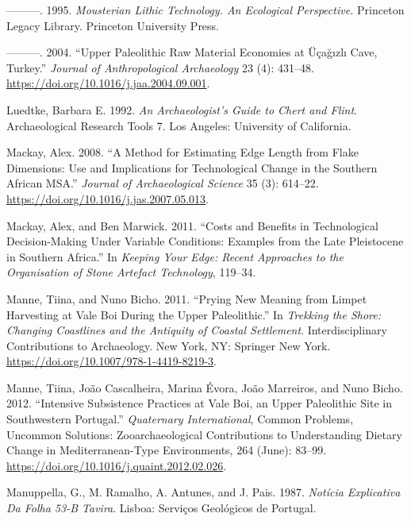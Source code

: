 \documentclass[
  a4paper,
  DIV=11,
  numbers=noendperiod]{scrreprt}
\newlength{\cslhangindent}
\newenvironment{CSLReferences}[2] %
 {\begin{list}{}{%
  \setlength{\itemindent}{0pt}
  \setlength{\leftmargin}{0pt}
  \setlength{\parsep}{0pt}
  \ifodd #1
   \setlength{\leftmargin}{\cslhangindent}
   \setlength{\itemindent}{-1\cslhangindent}
  \fi
  \setlength{\itemsep}{#2\baselineskip}}}
 {\end{list}}
\begin{document}
\begin{CSLReferences}{1}{0}
---------. 1995. \emph{Mousterian {Lithic Technology}. {An} Ecological
Perspective.} Princeton {Legacy Library}. Princeton University Press.

---------. 2004. {``Upper {Paleolithic} Raw Material Economies at
{{Ü}{ç}a{ğ}{ı}zl{ı}} Cave, {Turkey}.''} \emph{Journal of Anthropological
Archaeology} 23 (4): 431--48.
\url{https://doi.org/10.1016/j.jaa.2004.09.001}.

Luedtke, Barbara E. 1992. \emph{An {Archaeologist}'s {Guide} to {Chert}
and {Flint}}. Archaeological {Research Tools} 7. Los Angeles: University
of California.

Mackay, Alex. 2008. {``A Method for Estimating Edge Length from Flake
Dimensions: Use and Implications for Technological Change in the
Southern {African MSA}.''} \emph{Journal of Archaeological Science} 35
(3): 614--22. \url{https://doi.org/10.1016/j.jas.2007.05.013}.

Mackay, Alex, and Ben Marwick. 2011. {``Costs and Benefits in
Technological Decision-Making Under Variable Conditions: Examples from
the Late {Pleistocene} in Southern {Africa}.''} In \emph{Keeping {Your
Edge}: {Recent Approaches} to the {Organisation} of {Stone Artefact
Technology}}, 119--34.

Manne, Tiina, and Nuno Bicho. 2011. {``Prying {New Meaning} from {Limpet
Harvesting} at {Vale Boi During} the {Upper Paleolithic}.''} In
\emph{Trekking the {Shore}: {Changing Coastlines} and the {Antiquity} of
{Coastal Settlement}}. Interdisciplinary {Contributions} to
{Archaeology}. New York, NY: Springer New York.
\url{https://doi.org/10.1007/978-1-4419-8219-3}.

Manne, Tiina, João Cascalheira, Marina Évora, João Marreiros, and Nuno
Bicho. 2012. {``Intensive Subsistence Practices at {Vale Boi}, an {Upper
Paleolithic} Site in Southwestern {Portugal}.''} \emph{Quaternary
International}, Common {Problems}, {Uncommon Solutions}:
{Zooarchaeological Contributions} to {Understanding Dietary Change} in
{Mediterranean-Type Environments}, 264 (June): 83--99.
\url{https://doi.org/10.1016/j.quaint.2012.02.026}.

Manuppella, G., M. Ramalho, A. Antunes, and J. Pais. 1987.
\emph{Not{í}cia Explicativa Da Folha 53-{B Tavira}}. Lisboa: Servi{ç}os
Geol{ó}gicos de Portugal.


\end{CSLReferences}
\end{document}
